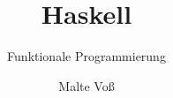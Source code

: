 \documentclass[4:3]{sdqbeamer}
\title{Haskell}
\subtitle{Funktionale Programmierung}
\author{Malte Vo\ss}
\date{}        %
\begin{document}
\KITtitleframe


\end{document}
